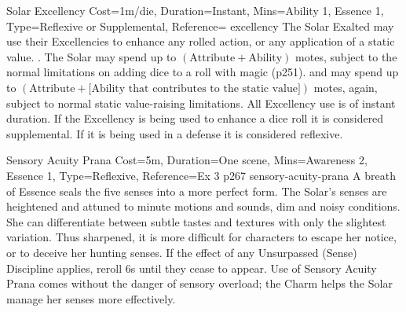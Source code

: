 

\begin{Charm}{Solar Excellency}{
    Cost=1m/die,
    Duration=Instant,
    Mins={Ability 1, Essence 1},
    Type=Reflexive or Supplemental,
    Reference={\cite{ex3}}
}{excellency}
    The Solar Exalted may use their Excellencies to enhance any rolled action,
    or any application of a static value. . The
    Solar may spend up to $(\text{Attribute} + \text{Ability})$ motes, subject
    to the normal limitations on adding dice to a roll with magic (p251).
    and may spend up to $(\text{Attribute} + \text{[Ability that contributes to
    the static value]})$ motes, again, subject to normal static value-raising
    limitations. All Excellency use is of instant duration. If the Excellency
    is being used to enhance a dice roll it is considered supplemental. If it
    is being used in a defense it is considered reflexive.
\end{Charm}




\begin{Charm}{Sensory Acuity Prana}{
    Cost=5m,
    Duration=One scene,
    Mins={Awareness 2, Essence 1},
    Type=Reflexive,
    Reference=Ex 3 p267
}{sensory-acuity-prana}
    A breath of Essence seals the five senses into a more perfect form. The
    Solar’s senses are heightened and attuned to minute motions and sounds, dim
    and noisy conditions. She can differentiate between subtle tastes and
    textures with only the slightest variation. Thus sharpened, it is more
    difficult for characters to escape her notice, or to deceive her hunting
    senses.  If the effect of any Unsurpassed (Sense)
    Discipline applies, reroll 6s until they cease to appear. Use of Sensory
    Acuity Prana comes without the danger of sensory overload; the Charm helps
    the Solar manage her senses more effectively.
\end{Charm}

